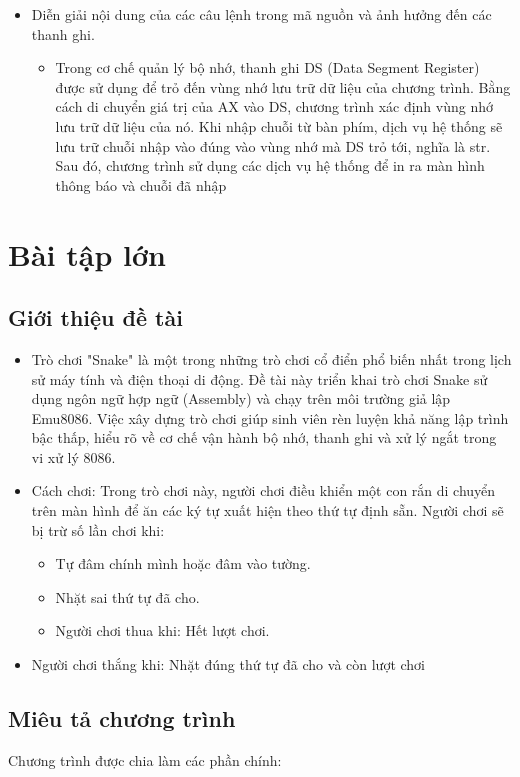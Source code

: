 \documentclass[12pt]{article}
\begin{document}
\begin{itemize}
  \item Diễn giải nội dung của các câu lệnh trong mã nguồn và ảnh hưởng đến các thanh ghi.
  \begin{itemize}
    \item Trong cơ chế quản lý bộ nhớ, thanh ghi DS (Data Segment Register) được sử dụng
để trỏ đến vùng nhớ lưu trữ dữ liệu của chương trình. Bằng cách di chuyển giá trị
của AX vào DS, chương trình xác định vùng nhớ lưu trữ dữ liệu của nó. Khi nhập
chuỗi từ bàn phím, dịch vụ hệ thống sẽ lưu trữ chuỗi nhập vào đúng vào vùng
nhớ mà DS trỏ tới, nghĩa là str. Sau đó, chương trình sử dụng các dịch vụ hệ thống
để in ra màn hình thông báo và chuỗi đã nhập
  \end{itemize}
\end{itemize}


\section{Bài tập lớn}
\subsection{Giới thiệu đề tài}
\begin{itemize}
  \item Trò chơi "Snake" là một trong những trò chơi cổ điển phổ biến nhất trong lịch sử máy tính và điện thoại di động. Đề tài này triển khai trò chơi Snake sử dụng ngôn ngữ hợp ngữ (Assembly) và chạy trên môi trường giả lập Emu8086. Việc xây dựng trò chơi giúp sinh viên rèn luyện khả năng lập trình bậc thấp, hiểu rõ về cơ chế vận hành bộ nhớ, thanh ghi và xử lý ngắt trong vi xử lý 8086.
  \item Cách chơi:
Trong trò chơi này, người chơi điều khiển một con rắn di chuyển trên màn hình để ăn các ký tự xuất hiện theo thứ tự định sẵn.
Người chơi sẽ bị trừ số lần chơi khi:
\begin{itemize}
  \item 
Tự đâm chính mình hoặc đâm vào tường.
\item Nhặt sai thứ tự đã cho.
\item Người chơi thua khi: Hết lượt chơi.

\end{itemize}
\item Người chơi thắng khi: Nhặt đúng thứ tự đã cho và còn lượt chơi
\end{itemize}
\subsection{Miêu tả chương trình }
Chương trình được chia làm các phần chính:
\end{document}
